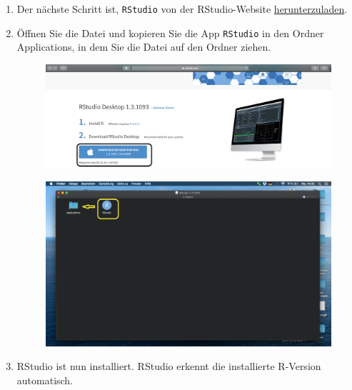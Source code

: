 \documentclass[12pt,a4paper]{article}
\let\origfigure\figure
\let\endorigfigure\endfigure
\renewenvironment{figure}[1][2] {
    \expandafter\origfigure\expandafter[H]
} {
    \endorigfigure
}
\begin{document}
\begin{enumerate}
  \item Der nächste Schritt ist, \texttt{RStudio} von der RStudio-Website \href{https://rstudio.com/products/rstudio/download/#download}{herunterzuladen}.
  \item Öffnen Sie die Datei und kopieren Sie die App \texttt{RStudio} in den Ordner Applications, in dem Sie die Datei auf den Ordner ziehen.
  \begin{figure}
\centering
\begin{subfigure}{.5\textwidth}
  \centering
  \includegraphics[width=.95\linewidth]{images/r_studio_mac.PNG}
  \label{fig:c}
\end{subfigure}%
\begin{subfigure}{.5\textwidth}
  \centering
  \includegraphics[width=.95\linewidth]{images/mac_r_studio_install.PNG}
  \label{fig:start.mac_sub_2}
\end{subfigure}
\label{fig:start.mac_sub_2}
\caption{Homepage von RStudio (links), Installation von RStudio (rechts)}
\end{figure}
  \item RStudio ist nun installiert. RStudio erkennt die installierte R-Version automatisch.
\end{enumerate}
\end{document}
